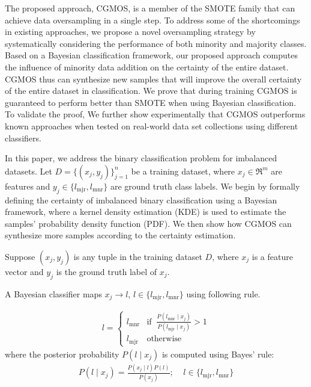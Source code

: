 \documentclass{iitthesis}
\begin{document}
The proposed approach, CGMOS, is a member of the SMOTE family that can achieve data oversampling in a single step. To address some of the shortcomings in existing approaches, we propose a novel oversampling strategy by systematically considering the performance of both minority and majority classes. Based on a Bayesian classification framework, our proposed approach computes the influence of minority data addition on the certainty of the entire dataset. CGMOS thus can synthesize new samples that will improve the overall certainty of the entire dataset in classification. We prove that during training CGMOS is guaranteed to perform better than SMOTE when using Bayesian classification. To validate the proof, We further show experimentally that CGMOS outperforms known approaches when tested on real-world data set collections using different classifiers.


In this paper, we address the binary classification problem for imbalanced datasets. Let $D=\{(x_j, y_j)\}_{j=1}^n$ be a training dataset, where $x_j \in \mathfrak{R}^m$ are features and $y_j \in \{l_{\mbox{mjr}}, l_{\mbox{mnr}}\}$ are ground truth class labels. We begin by formally defining the certainty of imbalanced binary classification using a Bayesian framework, where a kernel density estimation (KDE) is used to estimate the samples' probability density function (PDF). We then show how CGMOS can synthesize more samples according to the certainty estimation.

 Suppose $(x_j, y_j)$ is any tuple in the training dataset $D$, where $x_j$ is a feature vector and $y_j$ is the ground truth label of $x_j$.

A Bayesian classifier maps $x_j \rightarrow l$, $l\in\{l_{\mbox{mjr}}, l_{\mbox{mnr}}\}$ using following rule. 

\begin{align*}
l = \left\{
\begin{array}{cl}
  l_{\mbox{mnr}} & \text{if} \;\; \frac{P(l_{\mbox{mnr}} \mid x_j)}{P(l_{\mbox{mjr}} \mid x_j)} > 1\\
  l_{\mbox{mjr}} & \text{otherwise}
\end{array}\right.
\end{align*}
where the posterior probability $P(l\mid x_j)$ is computed using Bayes' rule:
\begin{align*}
P(l \mid x_j) = \frac{P(x_j \mid l)P(l)}{P(x_j)}; \;\;\;\; l\in\{l_{\mbox{mjr}}, l_{\mbox{mnr}}\}
\end{align*}
\end{document}
